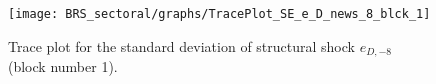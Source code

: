 \begin{figure}[H]
\centering
  \texttt{[image: BRS\_sectoral/graphs/TracePlot\_SE\_e\_D\_news\_8\_blck\_1]}\\
    \caption{Trace plot for the standard deviation of structural shock ${e_{D,-8}}$ (block number 1).}
\end{figure}
